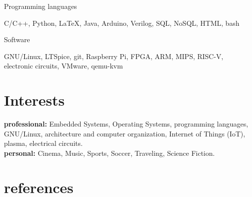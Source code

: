 \documentclass[]{friggeri-cv} %
\begin{document}
\begin{entrylist}


\entry
{}
{Programming languages}
{}
{}
{
C/C++, Python, \LaTeX, Java, Arduino, Verilog, SQL, NoSQL, HTML, bash

}


\entry
{}
{Software}
{}
{}
{
GNU/Linux, LTSpice, git, Raspberry Pi, FPGA, ARM, MIPS, RISC-V, electronic circuits, VMware, qemu-kvm

}


\end{entrylist}

\newpage

\section{Interests}
  \vspace{-0.2cm}

\textbf{professional:} Embedded Systems, Operating Systems, programming languages, 
GNU/Linux, architecture and computer organization, Internet of Things (IoT), plasma, electrical circuits. \\
\textbf{personal:}  Cinema, Music, Sports, Soccer, Traveling, Science Fiction.




\section{references}
\end{document}
